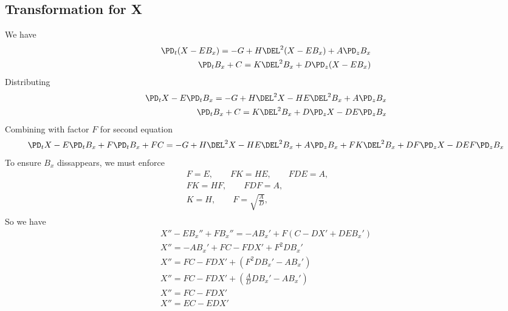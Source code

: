 \documentclass[11pt]{article}
\begin{document}
\subsection{Transformation for X}
We have
\begin{equation}\begin{aligned}
\PD_t (X - E B_x)        = -G+ H \DEL^2 (X - E B_x) + A \PD_z B_x \\
\PD_t B_x + C = K \DEL^2 B_x + D \PD_z (X - E B_x) \\
\end{aligned} \end{equation}
Distributing
\begin{equation}\begin{aligned}
\PD_t X - E \PD_t B_x = -G+ H \DEL^2 X - H E \DEL^2 B_x + A \PD_z B_x \\
\PD_t B_x + C = K \DEL^2 B_x + D \PD_z X - D E \PD_z B_x \\
\end{aligned} \end{equation}
Combining with factor $F$ for second equation
\begin{equation}\begin{aligned}
\PD_t X - E \PD_t B_x + F \PD_t B_x + FC = -G+ H \DEL^2 X - H E \DEL^2 B_x + A \PD_z B_x + F K \DEL^2 B_x + DF \PD_z X - D EF \PD_z B_x\\
\end{aligned} \end{equation}
To ensure $B_x$ dissappears, we must enforce
\begin{equation}\begin{aligned}
F = E, \qquad
FK = HE, \qquad
FDE = A, \qquad \\
FK = HF, \qquad
FDF = A, \qquad \\
K = H, \qquad
F = \sqrt{\frac{A}{D}}, \qquad \\
\end{aligned} \end{equation}
So we have
\begin{equation}\begin{aligned}
X'' - E B_x'' + FB_x''   = - A B_x' + F(C - D X' + D E B_x') \\
X'' = - A B_x' + FC - FD X' + F^2 D B_x' \\
X'' = FC - FD X' + (F^2 D B_x' - A B_x') \\
X'' = FC - FD X' + \left(\frac{A}{D} D B_x' - A B_x' \right) \\
X'' = FC - FD X' \\
X'' = EC - ED X' \\
\end{aligned} \end{equation}
\end{document}
